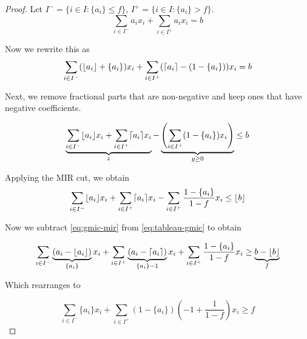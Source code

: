 \begin{proof}

Let $I^- = \{ i \in I : \{a_i\} \leq f\}$, $I^+ = \{i \in I : \{a_i\}> f\}$.
\begin{equation}
\label{eq:tableau-gmic}
\sum_{i \in I^{-}} a_ix_i + \sum_{i \in I^+} a_i x_i = b
\end{equation}

Now we rewrite this as
\begin{equation}
\sum_{i \in I^{-}} (\lfloor a_i \rfloor + \{a_i\} )x_i + \sum_{i \in I^+} (\lceil a_i \rceil - (1- \{a_i\})) x_i  = b
\end{equation}

Next, we remove fractional parts that are non-negative and keep ones that have negative coefficients.

\begin{equation}
\underbrace{\sum_{i \in I^{-}} \lfloor a_i \rfloor x_i + \sum_{i \in I^+} \lceil a_i \rceil x_i }_{z} - \underbrace{\left( \sum_{i \in I^+}  (1- \{a_i\}) x_i \right)}_{y \geq 0} \leq b
\end{equation}

Applying the MIR cut, we obtain
\begin{equation}
\label{eq:gmic-mir}
\sum_{i \in I^{-}} \lfloor a_i \rfloor x_i + \sum_{i \in I^+} \lceil a_i \rceil x_i - \sum_{i \in I^+}  \frac{1- \{a_i\}}{1-f} x_i \leq \lfloor b \rfloor
\end{equation}

Now we subtract \eqref{eq:gmic-mir} from \eqref{eq:tableau-gmic} to obtain

\begin{equation}
\label{eq:gmic-close}
\sum_{i \in I^{-}} \underbrace{(a_i - \lfloor a_i \rfloor)}_{\{a_i\}}x_i + \sum_{i \in I^+} \underbrace{(a_i - \lceil a_i \rceil)}_{\{a_i\} - 1}x_i + \sum_{i \in I^+}  \frac{1- \{a_i\}}{1-f} x_i \geq \underbrace{b - \lfloor b \rfloor}_{f}
\end{equation}

Which rearranges to 


\begin{equation}
\label{eq:gmic-close2}
\sum_{i \in I^{-}} \{a_i\} x_i + \sum_{i \in I^+} (1-\{a_i\})\left(-1+\frac{1}{1-f}\right)x_i\geq f
\end{equation}


\end{proof}
